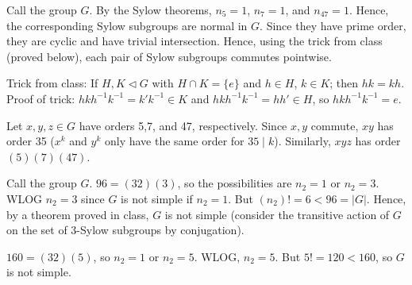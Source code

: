 \documentclass{article}
\begin{document}
 Call the group $G$. By the Sylow theorems, $n_5 = 1$, $n_7 = 1$, and $n_{47} = 1$. Hence, the corresponding Sylow subgroups are normal in $G$.  Since they have prime order, they are cyclic and have trivial intersection.   Hence, using the trick from class (proved below), each pair of Sylow subgroups commutes pointwise. 

Trick from class: If $H, K \lhd G$ with $H \cap K = \{e\}$ and $h \in H$, $k \in K$; then $hk = kh$.  Proof of trick: $hkh^{-1}k^{-1} = k' k^{-1} \in K$ and $hkh^{-1}k^{-1} = h h' \in H$, so $hkh^{-1}k^{-1} = e$.

Let $x,y,z \in G$ have orders 5,7, and 47, respectively.  Since $x,y$ commute, $xy$ has order 35 ($x^k$ and $y^{k}$ only have the same order for $35 \mid k$).  Similarly, $xyz$ has order $(5)(7)(47)$.


 Call the group $G$. $96 = (32)(3)$, so the possibilities are $n_2 = 1$ or $n_2 = 3$. WLOG $n_2 = 3$ since $G$ is not simple if $n_2 = 1$.  But $(n_2)! = 6  < 96 = |G|$. Hence, by a theorem proved in class, $G$ is not simple (consider the transitive action of $G$ on the set of 3-Sylow subgroups by conjugation).

 $160 = (32)(5)$, so $n_2 = 1$ or $n_2 = 5$.  WLOG, $n_2 = 5$.  But $5! = 120 < 160$, so $G$ is not simple.
\end{document}
